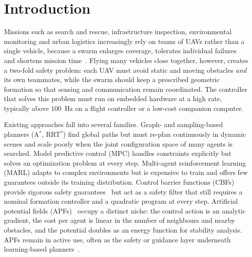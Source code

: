 \documentclass[11pt]{article}
\theoremstyle{definition}
\theoremstyle{remark}
\begin{document}
\section{Introduction}\label{sec:intro}

Missions such as search and rescue, infrastructure inspection, environmental
monitoring and urban logistics increasingly rely on teams of UAVs rather than a
single vehicle, because a swarm enlarges coverage, tolerates individual
failures and shortens mission time~\cite{chung2018survey,zhou2022swarm}. Flying
many vehicles close together, however, creates a two-fold safety problem: each
UAV must avoid static and moving obstacles \emph{and} its own teammates, while
the swarm should keep a prescribed geometric formation so that sensing and
communication remain coordinated. The controller that solves this problem must
run on embedded hardware at a high rate, typically above \SI{100}{\hertz} on a
flight controller or a low-cost companion computer.

Existing approaches fall into several families. Graph- and sampling-based
planners (A$^\ast$, RRT$^\ast$) find global paths but must re-plan continuously
in dynamic scenes and scale poorly when the joint configuration space of many
agents is searched. Model predictive control (MPC) handles constraints
explicitly but solves an optimization problem at every step. Multi-agent
reinforcement learning (MARL) adapts to complex environments but is expensive to
train and offers few guarantees outside its training distribution. Control
barrier functions (CBFs) provide rigorous safety guarantees~\cite{wang2017barrier}
but act as a safety filter that still requires a nominal formation controller
and a quadratic program at every step. Artificial potential fields
(APFs)~\cite{khatib1986} occupy a distinct niche: the control action is an
analytic gradient, the cost per agent is linear in the number of neighbours and
nearby obstacles, and the potential doubles as an energy function for stability
analysis. APFs remain in active use, often as the safety or guidance layer
underneath learning-based planners~\cite{zhao2026stamaddpg,shibu2026skysim}.
\end{document}
